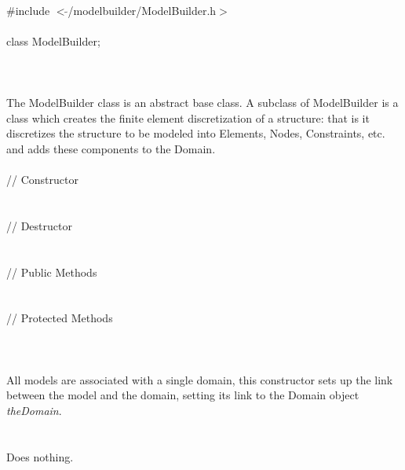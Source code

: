 
   \\
\indent \#include $<\tilde{ }$/modelbuilder/ModelBuilder.h$>$  \\

  \\
\indent class ModelBuilder;  \\

 \\
 \\

 \\ 
\indent The ModelBuilder class is an abstract base class. A subclass
of ModelBuilder is a class which creates the finite element
discretization of a structure: that is it discretizes the structure to
be modeled into Elements, Nodes, Constraints, etc. and adds these
components to the Domain.  \\

 \\
\indent // Constructor \\ 
\\ \\
\indent // Destructor \\ 
\\  \\
\indent // Public Methods \\ 
 \\ \\
\indent // Protected Methods \\
 \\

 \\ 
\\ 
All models are associated with a single domain, this constructor
sets up the link between the model and the domain, setting its link
to the Domain object {\em theDomain}. \\

 \\
\\ 
Does nothing. \\

